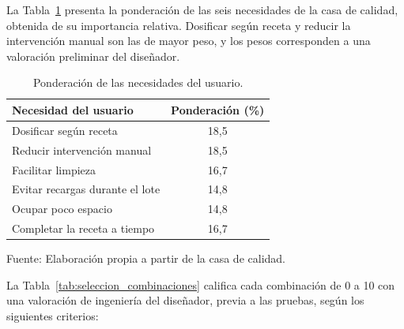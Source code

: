 La Tabla~\ref{tab:ponderacion_necesidades} presenta la ponderación de
las seis necesidades de la casa de calidad, obtenida de su importancia
relativa. Dosificar según receta y reducir la intervención manual son
las de mayor peso, y los pesos corresponden a una valoración preliminar
del diseñador.

\begin{table}[H]
    \centering
    \caption{Ponderación de las necesidades del usuario.}
    \label{tab:ponderacion_necesidades}
    \footnotesize
    \renewcommand{\arraystretch}{1.15}
    \begin{tabular}{lc}
        \toprule
        \textbf{Necesidad del usuario} & \textbf{Ponderación (\%)} \\
        \midrule
        Dosificar según receta & 18,5 \\
        Reducir intervención manual & 18,5 \\
        Facilitar limpieza & 16,7 \\
        Evitar recargas durante el lote & 14,8 \\
        Ocupar poco espacio & 14,8 \\
        Completar la receta a tiempo & 16,7 \\
        \bottomrule
    \end{tabular}
    \par\smallskip
    Fuente: Elaboración propia a partir de la casa de calidad.
\end{table}

La Tabla~\ref{tab:seleccion_combinaciones} califica cada combinación de
0 a 10 con una valoración de ingeniería del diseñador, previa a las
pruebas, según los siguientes criterios:

